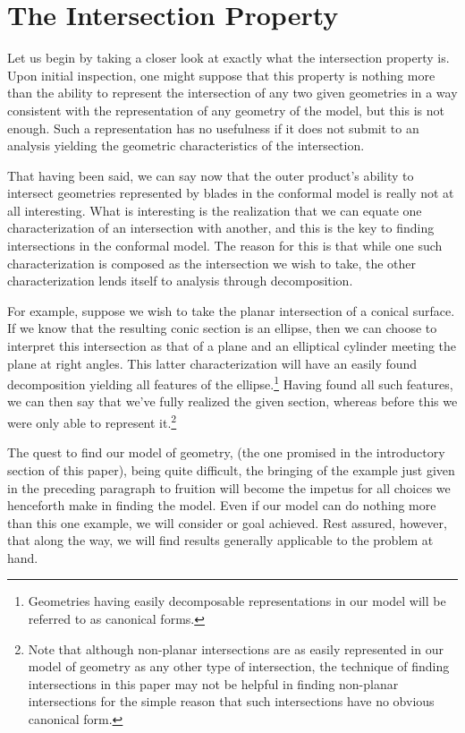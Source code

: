 \documentclass{birkjour}
\theoremstyle{definition}
\theoremstyle{remark}
\numberwithin{equation}{section}
\begin{document}
\section{The Intersection Property}

Let us begin by taking a closer look at exactly what the intersection property is.
Upon initial inspection, one might suppose that this property is nothing more than
the ability to represent the intersection of any two given geometries in a way consistent
with the representation of any geometry of the model, but this is not
enough.  Such a representation has no usefulness if it does not submit to an
analysis yielding the geometric characteristics of the intersection.

That having been said, we can say now that the outer product's ability to intersect geometries represented
by blades in the conformal model is really not at all interesting.  What is interesting
is the realization that we can equate one characterization of an intersection
with another, and this is the key to finding intersections in the conformal model.
The reason for this is that while one such characterization is composed as the
intersection we wish to take, the other characterization lends itself to
analysis through decomposition.

For example, suppose we wish to take the planar intersection of a conical surface.
If we know that the resulting conic section is an ellipse, then we can choose to
interpret this intersection as that of a plane and an elliptical cylinder meeting
the plane at right angles.  This latter characterization will have an easily found decomposition
yielding all features of the ellipse.\footnote{Geometries having easily decomposable
representations in our model will be referred to as canonical forms.}
Having found all such features, we can then say that we've
fully realized the given section, whereas before this we were only able to
represent it.\footnote{Note that although non-planar intersections are as easily
represented in our model of geometry as any other type of intersection,
the technique of finding intersections in this paper
may not be helpful in finding non-planar intersections for the simple reason that such intersections
have no obvious canonical form.}

The quest to find our model of geometry, (the one promised in the introductory section of
this paper), being quite difficult, the bringing of the example just given in the preceding paragraph
to fruition will become the impetus for all choices we henceforth make in finding the model.
Even if our model can do nothing more than this one example, we will consider or goal achieved.
Rest assured, however, that along the way, we will find results generally applicable to the problem at hand.
\end{document}
